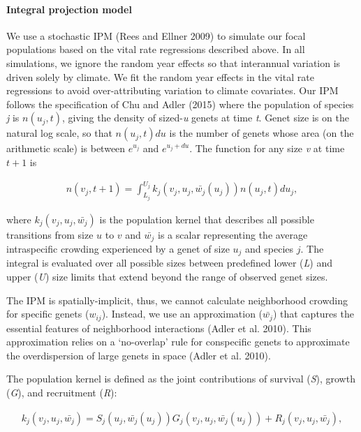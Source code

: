\documentclass[12pt,]{article}
\let\oldparagraph\paragraph
\renewcommand{\paragraph}[1]{\oldparagraph{#1}\mbox{}}
\begin{document}
\paragraph{Integral projection model}\label{integral-projection-model}

We use a stochastic IPM (Rees and Ellner 2009) to simulate our focal
populations based on the vital rate regressions described above. In all
simulations, we ignore the random year effects so that interannual
variation is driven solely by climate. We fit the random year effects in
the vital rate regressions to avoid over-attributing variation to
climate covariates. Our IPM follows the specification of Chu and Adler
(2015) where the population of species \emph{j} is \(n(u_{j},t)\),
giving the density of sized-\emph{u} genets at time \emph{t}. Genet size
is on the natural log scale, so that \(n(u_{j},t)du\) is the number of
genets whose area (on the arithmetic scale) is between \(e^{u_{j}}\) and
\(e^{u_{j}+du}\). The function for any size \emph{v} at time \(t+1\) is

\vspace{-3em}\begin{align}
n(v_{j},t+1) = \int_{L_{j}}^{U_{j}} k_{j}(v_{j},u_{j},\bar{w_{j}}(u_{j}))n(u_{j},t)du_{j},
\end{align}\vspace{-3em}

where \(k_{j}(v_{j},u_{j},\bar{w_{j}})\) is the population kernel that
describes all possible transitions from size \(u\) to \(v\) and
\(\bar{w_{j}}\) is a scalar representing the average intraspecific
crowding experienced by a genet of size \(u_j\) and species \(j\). The
integral is evaluated over all possible sizes between predefined lower
(\emph{L}) and upper (\emph{U}) size limits that extend beyond the range
of observed genet sizes.

The IPM is spatially-implicit, thus, we cannot calculate neighborhood
crowding for specific genets (\(w_{ij}\)). Instead, we use an
approximation (\(\bar{w_{j}}\)) that captures the essential features of
neighborhood interactions (Adler et al. 2010). This approximation relies
on a `no-overlap' rule for conspecific genets to approximate the
overdispersion of large genets in space (Adler et al. 2010).

The population kernel is defined as the joint contributions of survival
(\emph{S}), growth (\emph{G}), and recruitment (\emph{R}):

\vspace{-3em}\begin{align}
k_{j}(v_{j},u_{j},\bar{w_{j}}) = S_j(u_j, \bar{w_{j}}(u_{j}))G_j(v_{j},u_{j},\bar{w_{j}}(u_{j})) + R_j(v_{j},u_{j},\bar{w_{j}}),
\end{align}\vspace{-3em}
\end{document}

